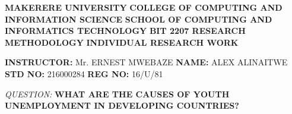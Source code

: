 \documentclass[10pt,a4paper]{article}
\author{ALINAITWE}
\begin{document}
\begin{center}
\textbf{MAKERERE UNIVERSITY} \newline
\textbf{COLLEGE OF COMPUTING AND INFORMATION SCIENCE} \newline
\textbf{SCHOOL OF COMPUTING AND INFORMATICS TECHNOLOGY} \newline
\textbf{BIT 2207 RESEARCH METHODOLOGY} \newline
\textbf{INDIVIDUAL RESEARCH WORK} \newline
\end{center}
\begin{flushleft}
\textbf{INSTRUCTOR:} Mr. ERNEST MWEBAZE \newline
\textbf{NAME:} ALEX ALINAITWE \newline
\textbf{STD NO:} 216000284 \newline
\textbf{REG NO:} 16/U/81 \newline
\end{flushleft}
\begin{center}
\textit{QUESTION:} \newline
\textbf{WHAT ARE THE CAUSES OF YOUTH UNEMPLOYMENT IN DEVELOPING COUNTRIES?}
\end{center}
\end{document}
